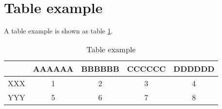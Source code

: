 \section{Table example}\label{sec:table}

A table example is shown as table \ref{tab:Table-example}.

\begin{table}[h]
\centering
\caption{Table example}\label{tab:Table-example}
\begin{tabular}{|c|c|c|c|c|}
\hline 
 & AAAAAA & BBBBBB & CCCCCC & DDDDDD\tabularnewline
\hline 
XXX & 1 & 2 & 3 & 4\tabularnewline
\hline 
YYY & 5 & 6 & 7 & 8\tabularnewline
\hline 
\end{tabular}
\end{table}
